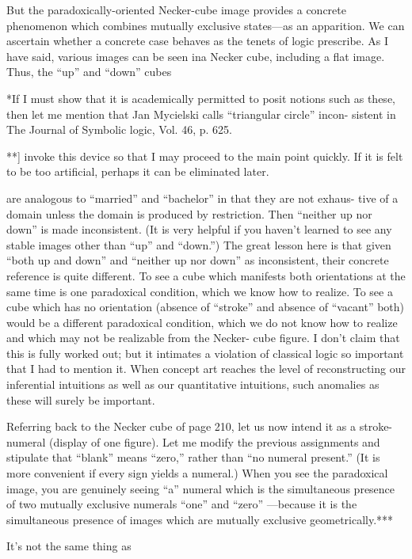 But the paradoxically-oriented Necker-cube image provides a 
concrete phenomenon which combines mutually exclusive states—as 
an apparition. We can ascertain whether a concrete case behaves as the 
tenets of logic prescribe. As I have said, various images can be seen ina 
Necker cube, including a flat image. Thus, the “up” and “down” cubes 


*If I must show that it is academically permitted to posit notions such as 
these, then let me mention that Jan Mycielski calls “triangular circle” incon- 
sistent in The Journal of Symbolic logic, Vol. 46, p. 625. 

**] invoke this device so that I may proceed to the main point quickly. If it 
is felt to be too artificial, perhaps it can be eliminated later. 


are analogous to “married” and “bachelor” in that they are not exhaus- 
tive of a domain unless the domain is produced by restriction. Then 
“neither up nor down” is made inconsistent. (It is very helpful if you 
haven't learned to see any stable images other than “up” and “down.”) 
The great lesson here is that given “both up and down” and “neither up 
nor down” as inconsistent, their concrete reference is quite different. To 
see a cube which manifests both orientations at the same time is one 
paradoxical condition, which we know how to realize. To see a cube 
which has no orientation (absence of “stroke” and absence of “vacant” 
both) would be a different paradoxical condition, which we do not 
know how to realize and which may not be realizable from the Necker- 
cube figure. I don’t claim that this is fully worked out; but it intimates a 
violation of classical logic so important that I had to mention it. When 
concept art reaches the level of reconstructing our inferential intuitions 
as well as our quantitative intuitions, such anomalies as these will surely 
be important. 

Referring back to the Necker cube of page 210, let us now intend it 
as a stroke-numeral (display of one figure). Let me modify the previous 
assignments and stipulate that “blank” means “zero,” rather than “no 
numeral present.” (It is more convenient if every sign yields a numeral.) 
When you see the paradoxical image, you are genuinely seeing “a” 
numeral which is the simultaneous presence of two mutually exclusive 
numerals “one” and “zero” —because it is the simultaneous presence of 
images which are mutually exclusive geometrically.*** 

It’s not the same thing as 


